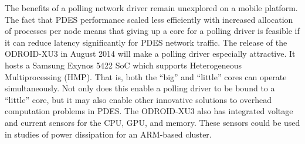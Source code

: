\documentclass[11pt]{book}
\begin{document}
The benefits of a polling network driver remain unexplored on a mobile platform. The fact
that PDES performance scaled less efficiently with increased allocation of processes per
node means that giving up a core for a polling driver is feasible if it can reduce latency
significantly for PDES network traffic. The release of the ODROID-XU3 \cite{xu3} in August
2014 will make a polling driver especially attractive. It hosts a Samsung Exynos 5422 SoC
which supports Heterogeneous Multiprocessing (HMP).  That is, both the ``big'' and
``little'' cores can operate simultaneously. Not only does this enable a polling driver to
be bound to a ``little'' core, but it may also enable other innovative solutions to
overhead computation problems in PDES. The ODROID-XU3 also has integrated voltage and
current sensors for the CPU, GPU, and memory. These sensors could be used in studies of
power dissipation for an ARM-based cluster.

\newpage
 

\end{document}
